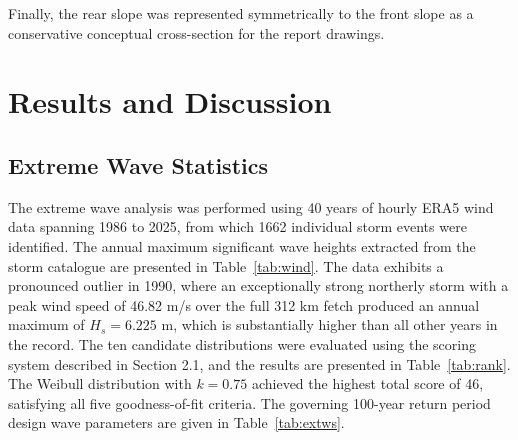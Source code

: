 \documentclass[a4paper, 11pt]{article}
\begin{document}
Finally, the rear slope was represented symmetrically to the front slope as a conservative conceptual cross-section for the report drawings.
\section{Results and Discussion}
\subsection{Extreme Wave Statistics}
\hspace{0.5cm}The extreme wave analysis was performed using 40 years of hourly ERA5 wind data spanning 1986 to 2025, from which 1662 individual storm events were identified. The annual maximum significant wave heights extracted from the storm catalogue are presented in Table~\ref{tab:wind}. The data exhibits a pronounced outlier in 1990, where an exceptionally strong northerly storm with a peak wind speed of 46.82 m/s over the full 312 km fetch produced an annual maximum of $H_{s} = 6.225$ m, which is substantially higher than all other years in the record. The ten candidate distributions were evaluated using the scoring system described in Section 2.1, and the results are presented in Table~\ref{tab:rank}. The Weibull distribution with $k = 0.75$ achieved the highest total score of 46, satisfying all five goodness-of-fit criteria. The governing 100-year return period design wave parameters are given in Table~\ref{tab:extws}.
\end{document}

